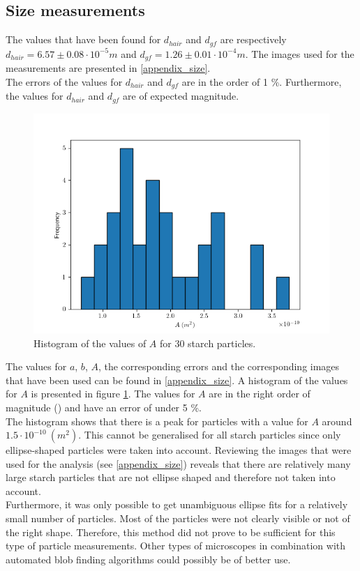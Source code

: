 \subsection{Size measurements}

The values that have been found for $d_{hair}$ and $d_{gf}$ are respectively $d_{hair} = 6.57 \pm 0.08 \cdot 10^{-5} m $ and $d_{gf} =  1.26 \pm 0.01 \cdot 10^{-4} m $. The images used for the measurements are presented in \ref{appendix_size}.\\
The errors of the values for $d_{hair}$ and $d_{gf}$ are in the order of 1 \%. Furthermore, the values for $d_{hair}$ and $d_{gf}$ are of expected magnitude.\\

\begin{figure}
    \includegraphics[width=1\linewidth,keepaspectratio]{afbeeldingen/histogram_zetmeel.png}
    \caption{Histogram of the values of $A$ for 30 starch particles.}
    \label{fig_histogram_zetmeel}
\end{figure}
The values for $a$, $b$, $A$, the corresponding errors and the corresponding images that have been used can be found in \ref{appendix_size}. A histogram of the values for $A$ is presented in figure \ref{fig_histogram_zetmeel}. The values for $A$ are in the right order of magnitude (\cite{starch}) and have an error of under 5 \%.\\
The histogram shows that there is a peak for particles with a value for $A$ around $1.5 \cdot 10^{-10} \: (m^2)$. This cannot be generalised for all starch particles since only ellipse-shaped particles were taken into account. Reviewing the images that were used for the analysis (see \ref{appendix_size}) reveals that there are relatively many large starch particles that are not ellipse shaped and therefore not taken into account.\\
Furthermore, it was only possible to get unambiguous ellipse fits for a relatively small number of particles. Most of the particles were not clearly visible or not of the right shape. Therefore, this method did not prove to be sufficient for this type of particle measurements. Other types of microscopes in combination with automated blob finding algorithms could possibly be of better use.\\

